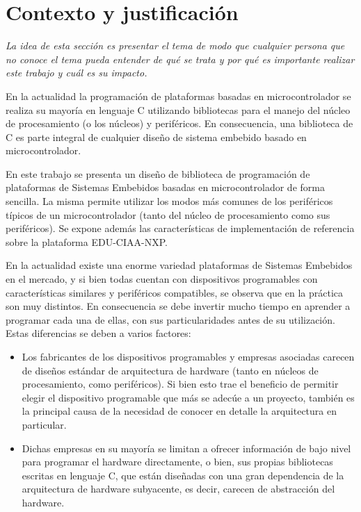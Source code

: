 \section{Contexto y justificación}
\label{sec:contextoYJustificacion}

\emph{La idea de esta sección es presentar el tema de modo que cualquier persona que no conoce el tema pueda entender de qué se trata y por qué es importante realizar este trabajo y cuál es su impacto.}


En la actualidad la programación de plataformas basadas en microcontrolador se realiza su mayoría en lenguaje C utilizando bibliotecas para el manejo del núcleo de procesamiento (o los núcleos) y periféricos. En consecuencia, una biblioteca de C es parte integral de cualquier diseño de sistema embebido basado en microcontrolador. 

En este trabajo se presenta un diseño de biblioteca de programación de plataformas de Sistemas Embebidos basadas en microcontrolador de forma sencilla. La misma permite utilizar los modos más comunes de los periféricos típicos de un microcontrolador (tanto del núcleo de procesamiento como sus periféricos). Se expone además las características de implementación de referencia sobre la plataforma EDU-CIAA-NXP.







En la actualidad existe una enorme variedad plataformas de Sistemas Embebidos en el mercado, y si bien todas cuentan con dispositivos programables con características similares y periféricos compatibles, se observa que en la práctica son muy distintos. En consecuencia se debe invertir mucho tiempo en aprender a programar cada una de ellas, con sus particularidades antes de su utilización. Estas diferencias se deben a varios factores:

\begin{itemize}
   \item Los fabricantes de los dispositivos programables y empresas asociadas carecen de diseños estándar de arquitectura de hardware (tanto en núcleos de procesamiento, como periféricos). Si bien esto trae el beneficio de permitir elegir el dispositivo programable que más se adecúe a un proyecto, también es la principal causa de la necesidad de conocer en detalle la arquitectura en particular.
   \item Dichas empresas en su mayoría se limitan a ofrecer información de bajo nivel para programar el hardware directamente, o bien, sus propias bibliotecas escritas en lenguaje C, que están diseñadas con una gran dependencia de la arquitectura de hardware subyacente, es decir, carecen de abstracción del hardware.
\end{itemize}




